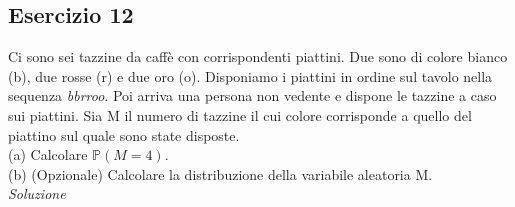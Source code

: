 \subsection{Esercizio 12}
Ci sono sei tazzine da caffè con corrispondenti piattini. Due sono di colore bianco (b), due rosse (r) e due oro (o). Disponiamo i piattini in ordine sul tavolo nella sequenza \textit{bbrroo}. Poi arriva una persona non vedente e dispone le tazzine a caso sui piattini. Sia M il numero di tazzine il cui colore corrisponde a quello del piattino sul quale sono state disposte. \\
(a) Calcolare $\mathbb{P}(M = 4)$. \\ (b) (Opzionale) Calcolare la distribuzione della variabile aleatoria M.
\\

\textit{Soluzione}



